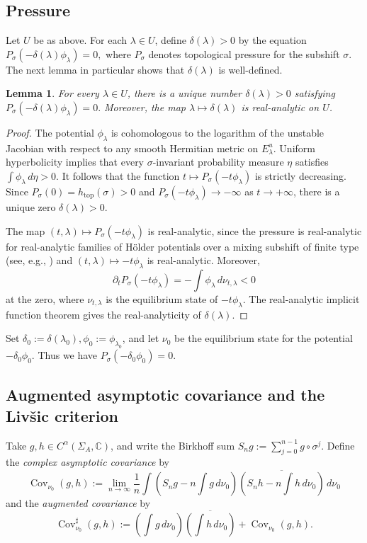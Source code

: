 \documentclass[11pt]{amsart}
\theoremstyle{plain}
\newtheorem{lem}[thm]{Lemma}
\theoremstyle{definition}
\theoremstyle{remark}
\begin{document}
\subsection{Pressure}
Let $U$ be as above.
For each $\lambda\in U$, define $\delta(\lambda)>0$ by the equation
$P_\sigma(-\delta(\lambda)\phi_\lambda)=0,
$
where $P_\sigma$ denotes topological pressure for the subshift $\sigma$. The next lemma 
in particular shows that $\delta(\lambda)$ is well-defined.

\begin{lem}
For every $\lambda\in U$, there is a unique number
$\delta(\lambda)>0$
satisfying
$P_\sigma(-\delta(\lambda)\phi_\lambda)=0.$
Moreover, the map
$\lambda\mapsto \delta(\lambda)$
is real-analytic on $U$.
\end{lem}

\begin{proof}
The potential $\phi_\lambda$ is cohomologous to the logarithm of the unstable
Jacobian with respect to any smooth Hermitian metric on $E_\lambda^u$.
Uniform hyperbolicity implies that every $\sigma$-invariant probability
measure $\eta$ satisfies
$\int \phi_\lambda\,d\eta>0.
$
It follows that the function
$t\mapsto P_\sigma(-t\phi_\lambda)$
is strictly decreasing. Since
$P_\sigma(0)=h_{\mathrm{top}}(\sigma)>0
$
and
$P_\sigma(-t\phi_\lambda)\to -\infty$ as $t\to+\infty$,
there is a unique zero $\delta(\lambda)>0$.

The map
$(t,\lambda)\mapsto P_\sigma(-t\phi_\lambda)$
is real-analytic,
since the
pressure is real-analytic for real-analytic families
of H\"older potentials over a mixing subshift of finite type 
(see, e.g., \cite{DTUZ26,PU,Parry90})
and $(t,\lambda)\mapsto -t\phi_\lambda$ is real-analytic. 
Moreover,
$$
\partial_t P_\sigma(-t\phi_\lambda)
=
-\int \phi_\lambda\,d\nu_{t,\lambda}<0
$$
at the zero, where $\nu_{t,\lambda}$ is the equilibrium state of
$-t\phi_\lambda$. The real-analytic implicit function theorem gives the
real-analyticity of $\delta(\lambda)$.
\end{proof}

Set
$\delta_0:=\delta(\lambda_0),
\phi_0:=\phi_{\lambda_0}$,
and let $\nu_0$ be the equilibrium state for the potential
$-\delta_0\phi_0$.
Thus we have
$P_\sigma(-\delta_0\phi_0)=0$.


\subsection{Augmented asymptotic covariance and the Livšic criterion}\label{sec:aug-covariance}
Take $g,h\in C^\alpha(\Sigma_A,\mathbb C)$, and write the Birkhoff sum
$S_ng:=\sum_{j=0}^{n-1}g\circ\sigma^j.
$
Define the {\it complex asymptotic covariance} by
$$
\operatorname{Cov}_{\nu_0}(g,h) :=
\lim_{n\to\infty} \frac1n
\int\left(S_ng-n\int g\,d\nu_0\right)
        \overline{
        \left(S_nh-n\int h\,d\nu_0\right)}
        \,d\nu_0
$$
and the
{\it augmented covariance} by
$$
\operatorname{Cov}^{\sharp}_{\nu_0}(g,h) := \left(\int g\,d\nu_0\right)
\overline{\left(\int h\,d\nu_0\right)}+
\operatorname{Cov}_{\nu_0}(g,h).
$$
\end{document}
